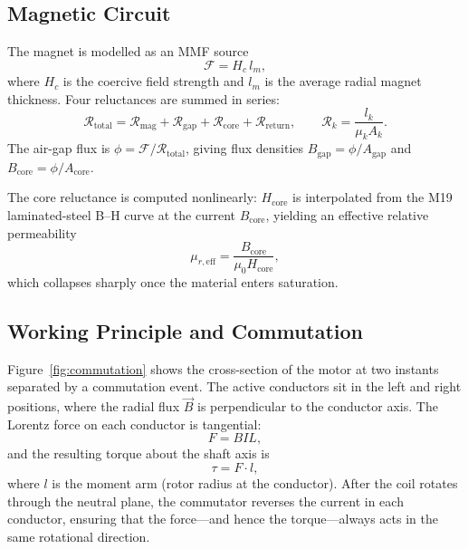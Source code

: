 \documentclass[10pt, twocolumn, a4paper]{article}
\begin{document}
\subsection{Magnetic Circuit}

The magnet is modelled as an MMF source
\begin{equation}
  \mathcal{F} = H_c \, l_m,
  \label{eq:mmf}
\end{equation}
where $H_c$ is the coercive field strength and $l_m$ is the average radial
magnet thickness. Four reluctances are summed in series:
\begin{equation}
  \mathcal{R}_\text{total} =
    \mathcal{R}_\text{mag} + \mathcal{R}_\text{gap} +
    \mathcal{R}_\text{core} + \mathcal{R}_\text{return},
  \qquad
  \mathcal{R}_k = \frac{l_k}{\mu_k A_k}.
  \label{eq:reluc}
\end{equation}
The air-gap flux is $\phi = \mathcal{F}/\mathcal{R}_\text{total}$, giving
flux densities $B_\text{gap} = \phi/A_\text{gap}$ and
$B_\text{core} = \phi/A_\text{core}$.

The core reluctance is computed nonlinearly: $H_\text{core}$ is
interpolated from the M19 laminated-steel B--H curve at the current
$B_\text{core}$, yielding an effective relative permeability
\begin{equation}
  \mu_{r,\text{eff}} = \frac{B_\text{core}}{\mu_0 H_\text{core}},
\end{equation}
which collapses sharply once the material enters saturation.

\subsection{Working Principle and Commutation}

Figure~\ref{fig:commutation} shows the cross-section of the motor at two
instants separated by a commutation event.  The active conductors sit in
the left and right positions, where the radial flux $\vec{B}$ is
perpendicular to the conductor axis.  The Lorentz force on each conductor
is tangential:
\begin{equation}
  F = BIL,
  \label{eq:BIL}
\end{equation}
and the resulting torque about the shaft axis is
\begin{equation}
  \tau = F \cdot l,
  \label{eq:tau}
\end{equation}
where $l$ is the moment arm (rotor radius at the conductor).  After the
coil rotates through the neutral plane, the commutator reverses the current
in each conductor, ensuring that the force---and hence the torque---always
acts in the same rotational direction.
\end{document}
